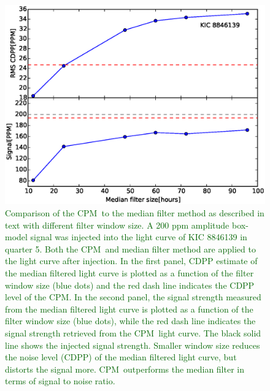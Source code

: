 \documentclass[12pt, preprint]{aastex}
\newcommand{\name}{CPM}
\newcommand{\revise}[1]{\textcolor{darkgreen}{#1}}
\begin{document}
\begin{figure}[p]
\begin{center}
\includegraphics[width=\textwidth]{f7a}
\end{center}
\caption{
  \label{filter} 
\revise{Comparison of the \name\ to the median filter method as described in text with different filter window size. A 200 ppm amplitude box-model signal was injected into the light curve of KIC 8846139 in quarter 5. Both the \name\ and median filter method are applied to the light curve after injection. In the first panel, CDPP estimate of the median filtered light curve is plotted as a function of the filter window size (blue dots) and the red dash line indicates the CDPP level of the \name. In the second panel, the signal strength measured from the median filtered light curve is plotted as a function of the filter window size (blue dots), while the red dash line indicates the signal strength retrieved from the \name\ light curve. The black solid line shows the injected signal strength. Smaller window size reduces the noise level (CDPP) of the median filtered light curve, but distorts the signal more. \name\ outperforms the median filter in terms of signal to noise ratio.}
}
\end{figure}
\end{document}

